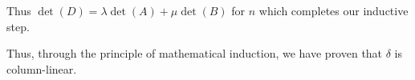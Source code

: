 \documentclass{report}
\begin{document}
{{		Thus \(\det(D) = \lambda \det(A) + \mu \det(B)\) for \(n\) which completes our inductive step.
	}

	Thus, through the principle of mathematical induction, we have proven that \(\delta\) is column-linear.

}
\end{document}
